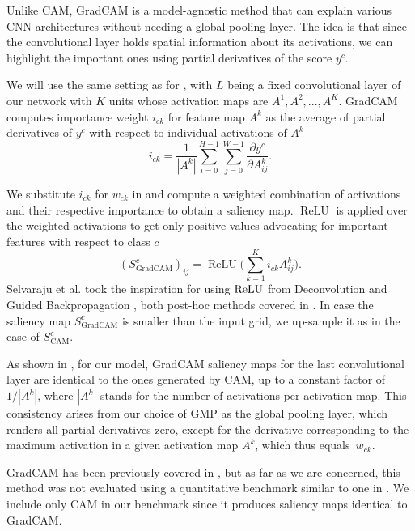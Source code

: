 Unlike CAM, GradCAM \cite{grad-cam} is a model-agnostic method that can explain various CNN architectures without needing a global pooling layer.
The idea is that since the convolutional layer holds spatial information about its activations, we can highlight the important ones using partial derivatives of the score $y^c$.

We will use the same setting as for , with $L$ being a fixed convolutional layer of our network with $K$ units whose activation maps are $A^1, A^2, ..., A^K$.
GradCAM computes importance weight $i_{ck}$ for feature map $A^k$ as the average of partial derivatives of $y^c$ with respect to individual activations of $A^k$
\begin{equation}\label{grad-cam-weights}
    i_{ck} = \frac{1}{|A^k|} \sum_{i=0}^{H-1} \sum_{j=0}^{W-1} \frac{\partial y^c}{\partial A^k_{ij}}.
\end{equation}

We substitute $i_{ck}$ for $w_{ck}$ in  and compute a weighted combination of activations and their respective importance to obtain a saliency map.
$\operatorname{ReLU}$ is applied over the weighted activations to get only positive values advocating for important features with respect to class $c$
\begin{equation}\label{eq:gradcam-saliency-map}
    (S^c_{\text{GradCAM}})_{ij} = \operatorname{ReLU}\biggl(\sum_{k=1}^K i_{ck} A^k_{ij}\biggr).
\end{equation}
Selvaraju et al. \cite{grad-cam} took the inspiration for using $\operatorname{ReLU}$ from Deconvolution \cite{deconvolution} and Guided Backpropagation \cite{guided-backprop}, both post-hoc methods covered in \cite{gallo}.
In case the saliency map $S^c_{\text{GradCAM}}$ is smaller than the input grid, we up-sample it as in the case of $S^c_{\text{CAM}}$.

As shown in \cite{bajger-grad-cam}, for our model, GradCAM saliency maps for the last convolutional layer are identical to the ones generated by CAM, up to a constant factor of ${1}/{|A^k|}$, where $|A^k|$ stands for the number of activations per activation map.
This consistency arises from our choice of GMP as the global pooling layer, which renders all partial derivatives zero, except for the derivative corresponding to the maximum activation in a given activation map $A^k$, which thus equals~$w_{ck}$.

GradCAM has been previously covered in \cite{hruska-grad-cam, krajnansky-grad-cam, bajger-grad-cam}, but as far as we are concerned, this method was not evaluated using a quantitative benchmark similar to one in \cite{gallo}.
We include only CAM in our benchmark since it produces saliency maps identical to GradCAM.

